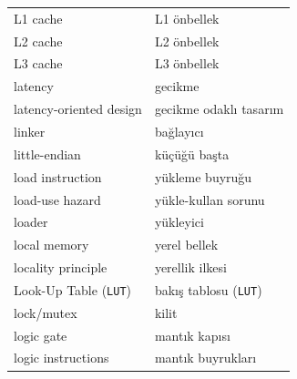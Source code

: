 {\begin{longtable}{@{}p{7.6cm}p{7.6cm}@{}}
L1 cache & L1 önbellek \\
L2 cache & L2 önbellek \\
L3 cache & L3 önbellek \\
latency & gecikme \\
latency-oriented design & gecikme odaklı tasarım \\
linker & bağlayıcı \\
little-endian & küçüğü başta \\
load instruction & yükleme buyruğu \\
load-use hazard & yükle-kullan sorunu \\
loader & yükleyici \\
local memory & yerel bellek \\
locality principle & yerellik ilkesi \\
Look-Up Table (\texttt{LUT}) & bakış tablosu (\texttt{LUT}) \\
lock/mutex & kilit \\
logic gate & mantık kapısı \\
logic instructions & mantık buyrukları \\


\end{longtable}}
